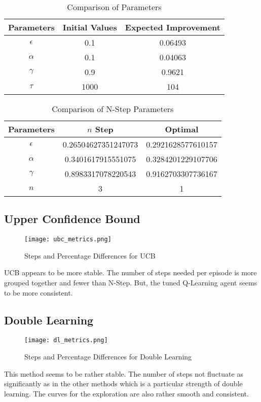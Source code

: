 \documentclass[conference]{IEEEtran}
\begin{document}
\begin{table}[htbp]
\caption{Comparison of Parameters}
\centering
\small 
\begin{tabular}{|c|c|c|}
\hline
\textbf{Parameters} & \textbf{Initial Values} & \textbf{Expected Improvement} \\ \hline
$\epsilon$ & 0.1 & 0.06493 \\ \hline
$\alpha$ & 0.1 & 0.04063 \\ \hline
$\gamma$ & 0.9 & 0.9621 \\ \hline
$\tau$ & 1000 & 104 \\ \hline
\end{tabular}
\label{tab:example}
\end{table}

\begin{table}[htbp]
\caption{Comparison of N-Step Parameters}
\centering
\small 
\begin{tabular}{|c|c|c|}
\hline
\textbf{Parameters} & \textbf{$n$ Step } & \textbf{Optimal} \\ \hline
$\epsilon$ &  0.26504627351247073 & 0.2921628577610157 \\ \hline
$\alpha$ & 0.3401617915551075 &  0.3284201229107706 \\ \hline
$\gamma$ & 0.8983317078220543 & 0.9162703307736167 \\ \hline
$n$ & 3 & 1 \\ \hline
\end{tabular}
\label{tab:example}
\end{table}

\subsection{Upper Confidence Bound}
\begin{figure}[htbp]
\centering
\texttt{[image: ubc\_metrics.png]}
\caption{Steps and Percentage Differences for UCB}
\label{fig:metrics}
\end{figure}
UCB appears to be more stable. The number of steps needed per episode is more grouped together and fewer than N-Step. But, the tuned Q-Learning agent seems to be more consistent. 

\subsection{Double Learning}
\begin{figure}[htbp]
\centering
\texttt{[image: dl\_metrics.png]}
\caption{Steps and Percentage Differences for Double Learning}
\label{fig:metrics}
\end{figure}
This method seems to be rather stable. The number of steps not fluctuate as significantly as in the other methods which is a particular strength of double learning. The curves for the exploration are also rather smooth and consistent. 
\end{document}

